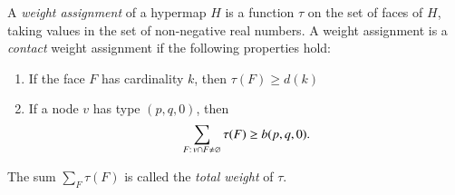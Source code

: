 \begin{definition}
%
A {\it weight assignment\/} of a hypermap $H$ is a function $\tau$ on
the set of faces of $H$, taking values in the set of non-negative
real numbers. A weight assignment is a {\it contact} weight assignment if the
following properties hold:
%
%
\begin{enumerate}
  \item If the face $F$ has cardinality $k$, then
        $\tau(F) \ge d(k)$
  \item If a node $v$ has type $(p,q,0)$, then
        $$\sum_{F:\,v\cap F\ne\varnothing} \tau(F) \ge b{(p,q,0)}.$$
\end{enumerate}
The sum $\sum_F \tau(F)$ is called the {\it total weight} of $\tau$.
%
\end{definition}



